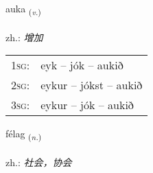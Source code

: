 \documentclass[frontgrid, backgrid]{flacards}\usepackage[]{graphicx}\usepackage[]{xcolor}
\begin{document}
\renewcommand{\blhead}{\vskip5pt {\small\bfseries\footnotesize Sagnorð | 动词 }}
\renewcommand{\bcfoot}{\vskip5pt \hspace{2pt}{\small\bfseries\footnotesize 1K}}


{auka \small{\textsubscript{(\textit{v.})}} \\[1ex] %
\textphonetic{[œiːka]} \\
zh.: \emph{增加} \\  [2ex]
\renewcommand*{\arraystretch}{0.8}
\begin{tabular}{p{1cm}l}
\textsc{1sg}: & eyk -- jók -- aukið \\ 
\textsc{2sg}: & eykur -- jókst -- aukið \\ 
\textsc{3sg}: & eykur -- jók -- aukið \\ 
\end{tabular}
}

\renewcommand{\flhead}{\vskip5pt \fboxsep=0pt {\small\bfseries\footnotesize Nafnorð | 名词}}
\renewcommand{\fcfoot}{\vskip5pt \fboxsep=0pt \hspace{2pt}{\small\bfseries\footnotesize 1K}}

\renewcommand{\blhead}{\vskip5pt {\small\bfseries\footnotesize Nafnorð | 名词 }}
\renewcommand{\bcfoot}{\vskip5pt \hspace{2pt}{\small\bfseries\footnotesize 1K}}


{félag \small{\textsubscript{(\textit{n.})}} \\[1ex] %
\textphonetic{[fjɛːlaɣ]} \\
zh.: \emph{社会，协会} \\  [2ex]
\renewcommand*{\arraystretch}{0.8}
}

\renewcommand{\flhead}{\vskip5pt \fboxsep=0pt {\small\bfseries\footnotesize Nafnorð | 名词}}
\renewcommand{\fcfoot}{\vskip5pt \fboxsep=0pt \hspace{2pt}{\small\bfseries\footnotesize 1K}}
\end{document}
